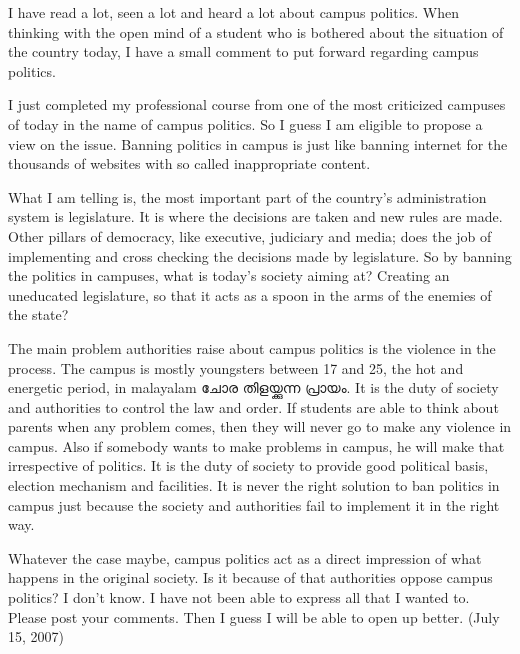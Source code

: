 \vskip 2pt
I have read a lot, seen a lot and heard a lot about campus politics. 
When thinking with the open mind of a student who is bothered about 
the situation of the country today, I have a small comment to put forward regarding campus politics.

I just completed my professional course from one of the most criticized campuses of 
today in the name of campus politics. So I guess I am eligible to propose a view on the issue. 
Banning politics in campus is just like banning internet for the thousands of websites with 
so called inappropriate content.

What I am telling is, the most important part of the country’s administration system is legislature. 
It is where the decisions are taken and new rules are made. Other pillars of democracy, 
like executive, judiciary and media; does the job of implementing and cross checking the decisions 
made by legislature. So by banning the politics in campuses, what is today's society aiming at? Creating an 
uneducated legislature, so that it acts as a spoon in the arms of the enemies of the state?

The main problem authorities raise about campus politics is the violence in the process. The campus
is mostly youngsters between 17 and 25, the hot and energetic period, in malayalam ചോര തിളയ്ക്കുന്ന പ്രായം. 
It is the duty of society and authorities to control the law and order. If students are able to think about
parents when any problem comes, then they will never go to make any violence in campus. Also if somebody wants 
to make problems in campus, he will make that irrespective of politics. It is the duty of society to provide good
political basis, election mechanism and facilities. It is never the right solution to ban politics in campus just 
because the society and authorities fail to implement it in the right way. 

Whatever the case maybe, campus politics act as a direct impression of what happens in the original society. 
Is it because of that authorities oppose campus politics? I don’t know. I have not been able to express all that I wanted to. 
Please post your comments. Then I guess I will be able to open up better. 
(July 15, 2007)
\newpage
